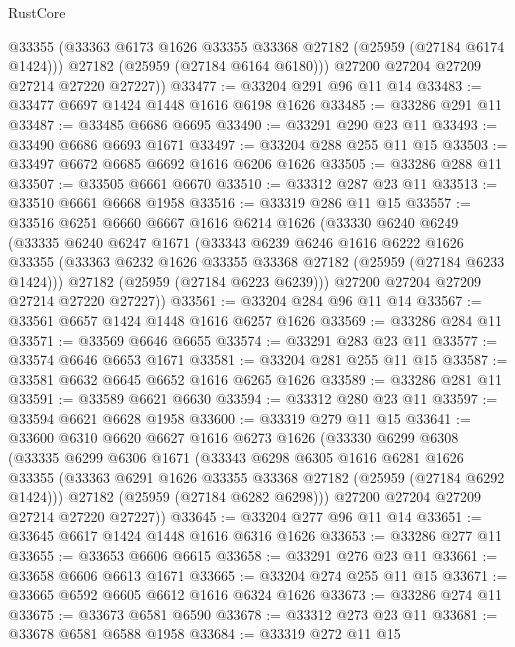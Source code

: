 \begin{lexlean}{RustCore}
\begin{coremodule}
          @33355
          (@33363 @6173 @1626 @33355 @33368 @27182 (@25959 (@27184 @6174 @1424)))
          @27182
          (@25959 (@27184 @6164 @6180)))
        @27200
        @27204
        @27209
        @27214
        @27220
        @27227))
@33477 := @33204 @291 @96 @11 @14
@33483 := @33477 @6697 @1424 @1448 @1616 @6198 @1626
@33485 := @33286 @291 @11
@33487 := @33485 @6686 @6695
@33490 := @33291 @290 @23 @11
@33493 := @33490 @6686 @6693 @1671
@33497 := @33204 @288 @255 @11 @15
@33503 := @33497 @6672 @6685 @6692 @1616 @6206 @1626
@33505 := @33286 @288 @11
@33507 := @33505 @6661 @6670
@33510 := @33312 @287 @23 @11
@33513 := @33510 @6661 @6668 @1958
@33516 := @33319 @286 @11 @15
@33557 := @33516
    @6251
    @6660
    @6667
    @1616
    @6214
    @1626
    (@33330
      @6240
      @6249
      (@33335
        @6240
        @6247
        @1671
        (@33343
          @6239
          @6246
          @1616
          @6222
          @1626
          @33355
          (@33363 @6232 @1626 @33355 @33368 @27182 (@25959 (@27184 @6233 @1424)))
          @27182
          (@25959 (@27184 @6223 @6239)))
        @27200
        @27204
        @27209
        @27214
        @27220
        @27227))
@33561 := @33204 @284 @96 @11 @14
@33567 := @33561 @6657 @1424 @1448 @1616 @6257 @1626
@33569 := @33286 @284 @11
@33571 := @33569 @6646 @6655
@33574 := @33291 @283 @23 @11
@33577 := @33574 @6646 @6653 @1671
@33581 := @33204 @281 @255 @11 @15
@33587 := @33581 @6632 @6645 @6652 @1616 @6265 @1626
@33589 := @33286 @281 @11
@33591 := @33589 @6621 @6630
@33594 := @33312 @280 @23 @11
@33597 := @33594 @6621 @6628 @1958
@33600 := @33319 @279 @11 @15
@33641 := @33600
    @6310
    @6620
    @6627
    @1616
    @6273
    @1626
    (@33330
      @6299
      @6308
      (@33335
        @6299
        @6306
        @1671
        (@33343
          @6298
          @6305
          @1616
          @6281
          @1626
          @33355
          (@33363 @6291 @1626 @33355 @33368 @27182 (@25959 (@27184 @6292 @1424)))
          @27182
          (@25959 (@27184 @6282 @6298)))
        @27200
        @27204
        @27209
        @27214
        @27220
        @27227))
@33645 := @33204 @277 @96 @11 @14
@33651 := @33645 @6617 @1424 @1448 @1616 @6316 @1626
@33653 := @33286 @277 @11
@33655 := @33653 @6606 @6615
@33658 := @33291 @276 @23 @11
@33661 := @33658 @6606 @6613 @1671
@33665 := @33204 @274 @255 @11 @15
@33671 := @33665 @6592 @6605 @6612 @1616 @6324 @1626
@33673 := @33286 @274 @11
@33675 := @33673 @6581 @6590
@33678 := @33312 @273 @23 @11
@33681 := @33678 @6581 @6588 @1958
@33684 := @33319 @272 @11 @15

\end{coremodule}
\end{lexlean}
